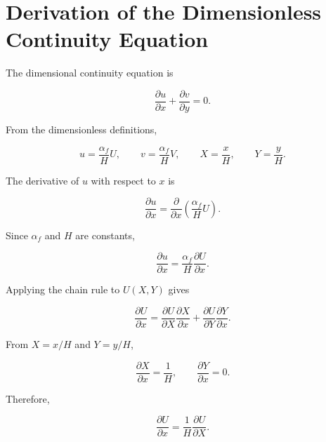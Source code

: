 \documentclass[preprint,3p,number]{elsarticle}
\begin{document}
\section{Derivation of the Dimensionless Continuity Equation}

The dimensional continuity equation is

\begin{equation}
\frac{\partial u}{\partial x}
+
\frac{\partial v}{\partial y}
=0.
\label{eq:continuity_start}
\end{equation}

From the dimensionless definitions,

\begin{equation}
u=\frac{\alpha_f}{H}U,
\qquad
v=\frac{\alpha_f}{H}V,
\qquad
X=\frac{x}{H},
\qquad
Y=\frac{y}{H}.
\label{eq:continuity_substitution}
\end{equation}

The derivative of \(u\) with respect to \(x\) is

\begin{equation}
\frac{\partial u}{\partial x}
=
\frac{\partial}{\partial x}
\left(\frac{\alpha_f}{H}U\right).
\end{equation}

Since \(\alpha_f\) and \(H\) are constants,

\begin{equation}
\frac{\partial u}{\partial x}
=
\frac{\alpha_f}{H}
\frac{\partial U}{\partial x}.
\end{equation}

Applying the chain rule to \(U(X,Y)\) gives

\begin{equation}
\frac{\partial U}{\partial x}
=
\frac{\partial U}{\partial X}
\frac{\partial X}{\partial x}
+
\frac{\partial U}{\partial Y}
\frac{\partial Y}{\partial x}.
\end{equation}

From \(X=x/H\) and \(Y=y/H\),

\begin{equation}
\frac{\partial X}{\partial x}=\frac{1}{H},
\qquad
\frac{\partial Y}{\partial x}=0.
\end{equation}

Therefore,

\begin{equation}
\frac{\partial U}{\partial x}
=
\frac{1}{H}\frac{\partial U}{\partial X}.
\end{equation}
\end{document}
